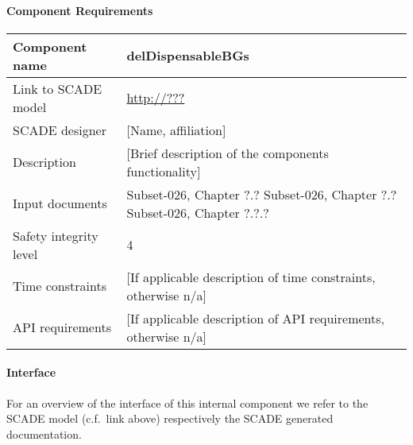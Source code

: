 
\paragraph{Component Requirements}

\begin{longtable}{p{}p{}}
\toprule
Component name			& delDispensableBGs \\
\midrule
Link to SCADE model		& {\footnotesize \url{http://???}} \\
\midrule
SCADE designer			& [Name, affiliation] \\
\midrule
Description				& [Brief description of the components functionality] \\
\midrule
Input documents	& 
Subset-026, Chapter ?.?\newline
Subset-026, Chapter ?.?\newline
Subset-026, Chapter ?.?.?\\
\midrule
Safety integrity level		& 4 \\
\midrule
Time constraints		& [If applicable description of time constraints, otherwise n/a] \\
\midrule
API requirements 		& [If applicable description of API requirements, otherwise n/a] \\
\bottomrule
\end{longtable}


\paragraph{Interface}

For an overview of the interface of this internal component we refer to the SCADE model (c.f.~link above) respectively the SCADE generated documentation.